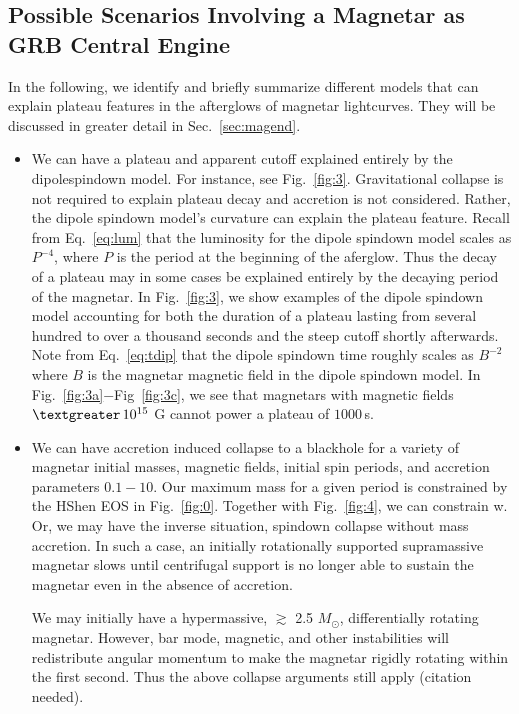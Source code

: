 \documentclass{article}
\begin{document}
\subsection{Possible Scenarios Involving a Magnetar as GRB Central Engine}

In the following, we identify and briefly summarize different models that can explain plateau features in the afterglows of magnetar lightcurves. They will be discussed in greater detail in Sec.~\ref{sec:magend}.

\begin{itemize}
\item We can have a plateau and apparent cutoff explained entirely by the dipolespindown model. For instance, see Fig.~\ref{fig:3}. Gravitational collapse is not required to explain plateau decay and accretion is not considered. Rather, the dipole spindown model's curvature can explain the plateau feature. Recall from Eq.~\ref{eq:lum} that the luminosity for the dipole spindown model scales as $P^{-4}$, where $P$ is the period at the beginning of the aferglow. Thus the decay of a plateau may in some cases be explained entirely by the decaying period of the magnetar. In Fig.~\ref{fig:3}, we show examples of the dipole spindown model accounting for both the duration of a plateau lasting from several hundred to over a thousand seconds and the steep cutoff shortly afterwards. Note from Eq.~\ref{eq:tdip} that the dipole spindown time roughly scales as $B^{-2}$ where $B$ is the magnetar magnetic field in the dipole spindown model. In Fig.~\ref{fig:3a}$-$Fig~\ref{fig:3c}, we see that magnetars with magnetic fields $\textgreater\,10^{15}$ G cannot power a plateau of $1000$\,s. \newline

\item We can have accretion induced collapse to a blackhole for a variety of magnetar initial masses, magnetic fields, initial spin periods, and accretion parameters $0.1-10$. Our maximum mass for a given period is constrained by the HShen EOS in Fig.~\ref{fig:0}. Together with Fig.~\ref{fig:4}, we can constrain w. Or, we may have the inverse situation, spindown collapse without mass accretion. In such a case, an initially rotationally supported supramassive magnetar slows until centrifugal support is no longer able to sustain the magnetar even in the absence of accretion.  \newline

We may initially have a hypermassive, $\gtrsim$ 2.5 $M_{\odot}$,  differentially rotating magnetar. However, bar mode, magnetic, and other instabilities will redistribute angular momentum to make the magnetar rigidly rotating within the first second. Thus the above collapse arguments still apply (citation needed). \newline


\end{itemize}
\end{document}
